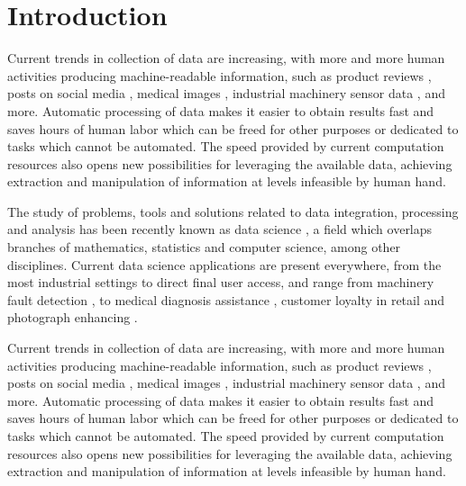 \setchapterpreamble[u]{\margintoc}
\chapter{Introduction}

Current trends in collection of data are increasing, with more and more human activities producing machine-readable information, such as product reviews , posts on social media , medical images , industrial machinery sensor data , and more. Automatic processing of data makes it easier to obtain  results fast and saves hours of human labor which can be freed for other purposes or dedicated to tasks which cannot be automated. The speed provided by current computation resources also opens new possibilities for leveraging the available data, achieving extraction and manipulation of information at levels infeasible by human hand.

The study of problems, tools and solutions related to data integration, processing and analysis has been recently known as data science , a field which overlaps branches of mathematics, statistics and computer science, among other disciplines. Current data science applications are present everywhere, from the most industrial settings to direct final user access, and range from machinery fault detection , to medical diagnosis assistance , customer loyalty in retail  and photograph enhancing .

\iffalse %
Current trends in collection of data are increasing, with more and more human activities producing machine-readable information, such as product reviews , posts on social media , medical images , industrial machinery sensor data , and more. Automatic processing of data makes it easier to obtain  results fast and saves hours of human labor which can be freed for other purposes or dedicated to tasks which cannot be automated. The speed provided by current computation resources also opens new possibilities for leveraging the available data, achieving extraction and manipulation of information at levels infeasible by human hand.

